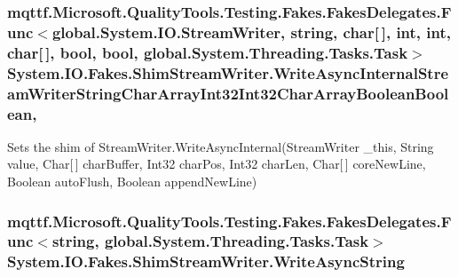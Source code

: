 \hypertarget{class_system_1_1_i_o_1_1_fakes_1_1_shim_stream_writer_a1896792429e2f3addfde6824de314c4d}{
\subsubsection[{Write\-Async\-Internal\-Stream\-Writer\-String\-Char\-Array\-Int32\-Int32\-Char\-Array\-Boolean\-Boolean}]{\setlength{\rightskip}{0pt plus 5cm}mqttf.\-Microsoft.\-Quality\-Tools.\-Testing.\-Fakes.\-Fakes\-Delegates.\-Func$<$global.\-System.\-I\-O.\-Stream\-Writer, string, char\mbox{[}$\,$\mbox{]}, int, int, char\mbox{[}$\,$\mbox{]}, bool, bool, global.\-System.\-Threading.\-Tasks.\-Task$>$ System.\-I\-O.\-Fakes.\-Shim\-Stream\-Writer.\-Write\-Async\-Internal\-Stream\-Writer\-String\-Char\-Array\-Int32\-Int32\-Char\-Array\-Boolean\-Boolean\hspace{0.3cm}{\ttfamily [static]}, {\ttfamily [set]}}}\label{class_system_1_1_i_o_1_1_fakes_1_1_shim_stream_writer_a1896792429e2f3addfde6824de314c4d}


Sets the shim of Stream\-Writer.\-Write\-Async\-Internal(\-Stream\-Writer \-\_\-this, String value, Char\mbox{[}$\,$\mbox{]} char\-Buffer, Int32 char\-Pos, Int32 char\-Len, Char\mbox{[}$\,$\mbox{]} core\-New\-Line, Boolean auto\-Flush, Boolean append\-New\-Line)

\hypertarget{class_system_1_1_i_o_1_1_fakes_1_1_shim_stream_writer_a3939d0f2637e3aefec732b6ea6cf156b}{
\subsubsection[{Write\-Async\-String}]{\setlength{\rightskip}{0pt plus 5cm}mqttf.\-Microsoft.\-Quality\-Tools.\-Testing.\-Fakes.\-Fakes\-Delegates.\-Func$<$string, global.\-System.\-Threading.\-Tasks.\-Task$>$ System.\-I\-O.\-Fakes.\-Shim\-Stream\-Writer.\-Write\-Async\-String\hspace{0.3cm}{\ttfamily [set]}}}\label{class_system_1_1_i_o_1_1_fakes_1_1_shim_stream_writer_a3939d0f2637e3aefec732b6ea6cf156b}


